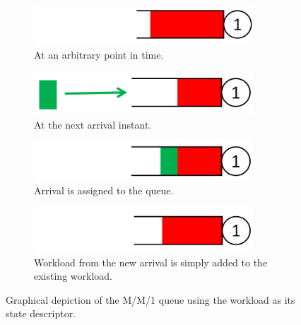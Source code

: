 \documentclass[12pt]{report}
\begin{document}
\begin{appendices}
\begin{figure}[t]
\begin{subfigure}{.6\textwidth}
\centering
\includegraphics[width=0.9\textwidth]{figures/Appendix/MM1_workload1.PNG}
\caption{At an arbitrary point in time.}
\label{fig:MM1_workload1}
\end{subfigure}
\begin{subfigure}{.6\textwidth}
\centering
\includegraphics[width=0.9\textwidth]{figures/Appendix/MM1_workload2.PNG}
\caption{At the next arrival instant.}
\label{fig:MM1_workload2}
\end{subfigure}
\begin{subfigure}{.6\textwidth}
\centering
\includegraphics[width=0.9\textwidth]{figures/Appendix/MM1_workload3.PNG}
\caption{Arrival is assigned to the queue.}
\label{fig:MM1_workload3}
\end{subfigure}
\begin{subfigure}{.6\textwidth}
\centering
\includegraphics[width=0.9\textwidth]{figures/Appendix/MM1_workload4.PNG}
\caption{Workload from the new arrival is simply added to the existing workload.}
\label{fig:MM1_workload4}
\end{subfigure}
\caption{Graphical depiction of the M/M/1 queue using the workload as its state descriptor.}\label{fig:MM1_workload}
\end{figure}


\end{appendices}
\end{document}
